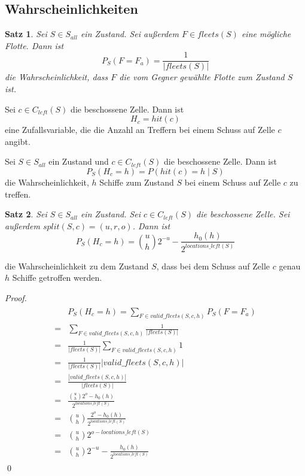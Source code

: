 \documentclass[a4paper,12pt]{llncs}
\numberwithin{equation}{section}
\newtheorem{satz}{Satz}
\begin{document}
\subsection{Wahrscheinlichkeiten}

\begin{satz}
Sei $S\in S_{all}$ ein Zustand.
Sei außerdem $F \in fleets(S)$ eine mögliche Flotte.
Dann ist
\[
P_S(F = F_a)=\frac{1}{|fleets(S)|}
\]
die Wahrscheinlichkeit, dass $F$ die vom Gegner gewählte Flotte zum Zustand $S$ ist.
\end{satz}

\begin{definition}
Sei $c \in C_{left}(S)$ die beschossene Zelle.
Dann ist
\[
H_{c}=hit(c)
\]
eine Zufallsvariable, die die Anzahl an Treffern bei einem Schuss auf Zelle $c$ angibt.
\end{definition}

\begin{definition}
Sei $S\in S_{all}$ ein Zustand und $c \in C_{left}(S)$ die beschossene Zelle.
Dann ist
\[
P_S(H_{c}=h)=P(hit(c)=h \mid S) 
\]
die Wahrscheinlichkeit, $h$ Schiffe zum Zustand $S$ bei einem Schuss auf Zelle $c$ zu treffen.
\end{definition}


\begin{satz}
Sei $S\in S_{all}$ ein Zustand.
Sei $c \in C_{left}(S)$ die beschossene Zelle.
Sei außerdem $split(S,c)=(u, r, o)$.
Dann ist
\[
P_S(H_c = h)=\binom{u}{h} 2^{-u} - \frac{h_0(h)}{2^{locations\_left(S)}}
\]
\end{satz}
die Wahrscheinlichkeit zu dem Zustand $S$, dass bei dem Schuss auf Zelle $c$ genau $h$ Schiffe getroffen werden.

\begin{proof}
\begin{align}
\begin{split}
&P_S(H_c = h)=\sum_{F \in valid\_fleets(S,c,h)} P_S(F = F_a) \\
=&\sum_{F \in valid\_fleets(S,c,h)} \frac{1}{|fleets(S)|} \\
=& \frac{1}{|fleets(S)|} \sum_{F \in valid\_fleets(S,c,h)} 1 \\
=& \frac{1}{|fleets(S)|} |valid\_fleets(S,c,h)| \\
=& \frac{|valid\_fleets(S,c,h)|}{|fleets(S)|} \\
=& \frac{\binom{u}{h} 2^o - h_0(h)}{2^{locations\_left(S)}} \\
=& \binom{u}{h} \frac{2^o - h_0(h)}{2^{locations\_left(S)}} \\
=& \binom{u}{h} 2^{o - locations\_left(S)} \\
=& \binom{u}{h} 2^{-u} - \frac{h_0(h)}{2^{locations\_left(S)}}
\end{split}
\end{align}
\qed
\end{proof}
\end{document}
